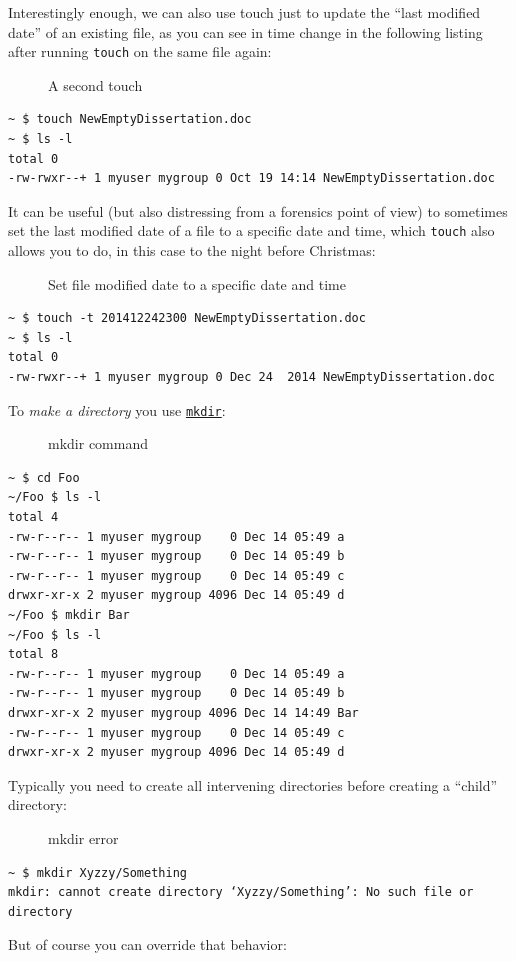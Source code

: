 \documentclass[10pt,]{book}
\numberwithin{figure}{chapter}
\DeclareRobustCommand{\drcap}[1]{\begin{figure}[H]\caption{#1}\end{figure}}
\DeclareRobustCommand{\drcmd}[1]{\index{Commands!#1}}
\begin{document}
Interestingly enough, we can also use touch just to update the ``last
modified date'' of an existing file, as you can see in time change in
the following listing after running \texttt{touch} on the same file
again:

\drcap{A second touch}

\begin{verbatim}
~ $ touch NewEmptyDissertation.doc
~ $ ls -l
total 0
-rw-rwxr--+ 1 myuser mygroup 0 Oct 19 14:14 NewEmptyDissertation.doc
\end{verbatim}

It can be useful (but also distressing from a forensics point of view)
to sometimes set the last modified date of a file to a specific date and
time, which \texttt{touch} also allows you to do, in this case to the
night before Christmas:

\drcap{Set file modified date to a specific date and time}

\begin{verbatim}
~ $ touch -t 201412242300 NewEmptyDissertation.doc
~ $ ls -l
total 0
-rw-rwxr--+ 1 myuser mygroup 0 Dec 24  2014 NewEmptyDissertation.doc
\end{verbatim}

To \emph{make a directory} you use
\href{http://linux.die.net/man/1/mkdir}{\texttt{mkdir}}\drcmd{mkdir}:

\drcap{mkdir command}

\begin{verbatim}
~ $ cd Foo
~/Foo $ ls -l
total 4
-rw-r--r-- 1 myuser mygroup    0 Dec 14 05:49 a
-rw-r--r-- 1 myuser mygroup    0 Dec 14 05:49 b
-rw-r--r-- 1 myuser mygroup    0 Dec 14 05:49 c
drwxr-xr-x 2 myuser mygroup 4096 Dec 14 05:49 d
~/Foo $ mkdir Bar
~/Foo $ ls -l
total 8
-rw-r--r-- 1 myuser mygroup    0 Dec 14 05:49 a
-rw-r--r-- 1 myuser mygroup    0 Dec 14 05:49 b
drwxr-xr-x 2 myuser mygroup 4096 Dec 14 14:49 Bar
-rw-r--r-- 1 myuser mygroup    0 Dec 14 05:49 c
drwxr-xr-x 2 myuser mygroup 4096 Dec 14 05:49 d
\end{verbatim}

Typically you need to create all intervening directories before creating
a ``child'' directory:

\drcap{mkdir error}

\begin{verbatim}
~ $ mkdir Xyzzy/Something
mkdir: cannot create directory ‘Xyzzy/Something’: No such file or directory
\end{verbatim}

But of course you can override that behavior:
\end{document}
